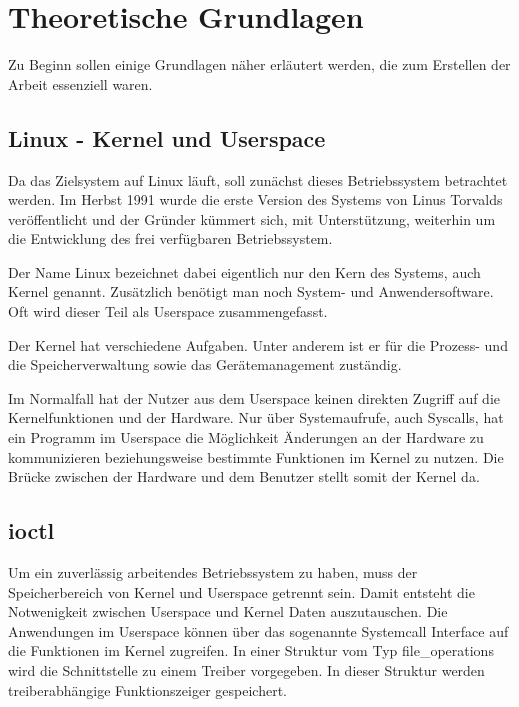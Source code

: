 \chapter{Theoretische Grundlagen} \label{sec:grund}
Zu Beginn sollen einige Grundlagen näher erläutert werden, die zum Erstellen der Arbeit essenziell waren.

\section{Linux - Kernel und Userspace}\label{sec:linux}
Da das Zielsystem auf Linux läuft, soll zunächst dieses Betriebssystem betrachtet werden. 
Im Herbst 1991 wurde die erste Version des Systems von Linus Torvalds veröffentlicht und der Gründer kümmert sich, mit Unterstützung, weiterhin um die Entwicklung des frei verfügbaren Betriebssystem.
 
Der Name Linux bezeichnet dabei eigentlich nur den Kern des Systems, auch Kernel genannt. Zusätzlich benötigt man noch System- und Anwendersoftware. Oft wird dieser Teil als Userspace zusammengefasst. \citep[S. 46]{plotner2012linux} 

Der Kernel hat verschiedene Aufgaben. Unter anderem ist er für die Prozess- und die Speicherverwaltung sowie das Gerätemanagement zuständig. \citep[S. 234]{schroder2009embedded} 

Im Normalfall hat der Nutzer aus dem Userspace keinen direkten Zugriff auf die Kernelfunktionen und der Hardware. Nur über Systemaufrufe, auch Syscalls, hat ein Programm im Userspace die Möglichkeit Änderungen an der Hardware zu kommunizieren beziehungsweise bestimmte Funktionen im Kernel zu nutzen. \citep[S. 124]{plotner2012linux} 
Die Brücke zwischen der Hardware und dem Benutzer stellt somit der Kernel da.


\section{\acl{ioctl}}\label{sec:ioctl_t}
Um ein zuverlässig arbeitendes Betriebssystem zu haben, muss der Speicherbereich von Kernel und Userspace getrennt sein. \citep[S. 232]{schroder2009embedded}
Damit entsteht die Notwenigkeit zwischen Userspace und Kernel Daten auszutauschen. Die Anwendungen im Userspace können über das sogenannte Systemcall Interface auf die Funktionen im Kernel zugreifen. In einer Struktur vom Typ file\_operations wird die Schnittstelle zu einem Treiber vorgegeben. In dieser Struktur werden treiberabhängige Funktionszeiger gespeichert. \citep[S. 249]{schroder2009embedded}

